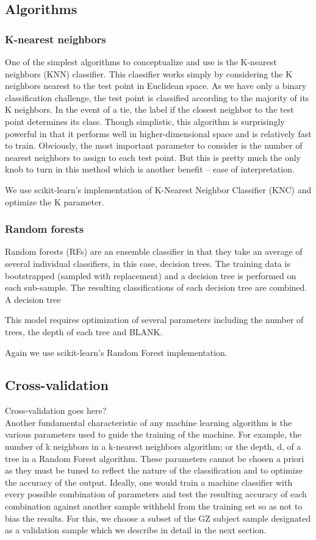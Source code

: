 \documentclass[twocolumn]{aastex6}
\begin{document}
\subsection{Algorithms}



\subsubsection{K-nearest neighbors}
One of the simplest algorithms to conceptualize and use is the K-nearest neighbors (KNN) classifier. This classifier works simply by considering the K neighbors nearest to the test point in Euclidean space. As we have only a binary classification challenge, the test point is classified according to the majority of its K neighbors. In the event of a tie, the label if the closest neighbor to the test point determines its class. Though simplistic, this algorithm is surprisingly powerful in that it performs well in higher-dimensional space and is relatively fast to train. Obviously, the most important parameter to consider is the number of nearest neighbors to assign to each test point. But this is pretty much the only knob to turn in this method which is another benefit -- ease of interpretation. 

We use scikit-learn's implementation of K-Nearest Neighbor Classifier (KNC) and optimize the K parameter. 

\subsubsection{Random forests}
Random forests (RFs) are an ensemble classifier in that they take an average of several individual classifiers, in this case, decision trees. The training data is bootstrapped (sampled with replacement) and a decision tree is performed on each sub-sample. The resulting classifications of each decision tree are combined. A decision tree 

This model requires optimization of several parameters including the number of trees, the depth of each tree and BLANK. 

Again we use scikit-learn's Random Forest implementation. 


\subsection{Cross-validation}
Cross-validation goes here? \\
Another fundamental characteristic of any machine learning algorithm is the various parameters used to guide the training of the machine. For example, the number of k neighbors in a k-nearest neighbors algorithm; or the depth, d, of a tree in a Random Forest algorithm. These parameters cannot be chosen a priori as they must be tuned to reflect the nature of the classification and to optimize the accuracy of the output. Ideally, one would train a machine classifier with every possible combination of parameters and test the resulting accuracy of each combination against another sample withheld from the training set so as not to bias the results. For this, we choose a subset of the GZ subject sample designated as a validation sample which we describe in detail in the next section. 
\end{document}
